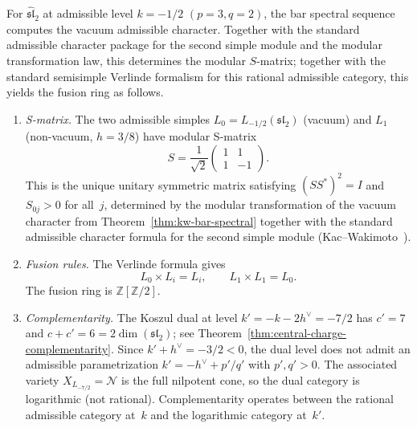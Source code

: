 \begin{proposition}[Admissible \texorpdfstring{$S$}{S}-matrix and Verlinde fusion package at \texorpdfstring{$k=-1/2$}{k=-1/2};
\ClaimStatusConditional]
\label{prop:admissible-verlinde-bar}
For $\widehat{\mathfrak{sl}}_2$ at admissible level
$k = -1/2$ $(p = 3, q = 2)$, the bar spectral sequence
computes the vacuum admissible character. Together with the
standard admissible character package for the second simple
module and the modular transformation law, this determines the
modular $S$-matrix; together with the standard semisimple
Verlinde formalism for this rational admissible category, this
yields the fusion ring as follows.
\begin{enumerate}[label=\textup{(\roman*)}]
\item \emph{S-matrix.} The two admissible simples
 $L_0 = L_{-1/2}(\mathfrak{sl}_2)$ (vacuum) and
 $L_1$ (non-vacuum, $h = 3/8$) have modular S-matrix
 \begin{equation}\label{eq:admissible-s-matrix}
 S = \frac{1}{\sqrt{2}}
 \begin{pmatrix}
 1 & 1 \\[3pt]
 1 & -1
 \end{pmatrix}.
 \end{equation}
 This is the unique unitary symmetric matrix satisfying
 $(SS^*)^2 = I$ and $S_{0j} > 0$ for all~$j$, determined
 by the modular transformation of the vacuum character from
 Theorem~\textup{\ref{thm:kw-bar-spectral}} together with the
 standard admissible character formula for the second simple
 module \textup{(}Kac--Wakimoto~\cite{KW88}\textup{)}.
\item \emph{Fusion rules.} The Verlinde formula gives
 \begin{equation}\label{eq:admissible-fusion}
 L_0 \times L_i = L_i, \qquad
 L_1 \times L_1 = L_0.
 \end{equation}
 The fusion ring is $\mathbb{Z}[\mathbb{Z}/2]$.
\item \emph{Complementarity.} The Koszul dual at level
 $k' = -k - 2h^\vee = -7/2$ has $c' = 7$ and
 $c + c' = 6 = 2\dim(\mathfrak{sl}_2)$;
 see Theorem~\ref{thm:central-charge-complementarity}.
 Since $k' + h^\vee = -3/2 < 0$, the dual level does not
 admit an admissible parametrization
 $k' = -h^\vee + p'/q'$ with $p', q' > 0$. The associated variety
 $X_{L_{-7/2}} = \mathcal{N}$ is the full nilpotent cone,
 so the dual category is logarithmic (not rational).
 Complementarity operates between the rational admissible
 category at~$k$ and the logarithmic category at~$k'$.
\end{enumerate}
\end{proposition}

